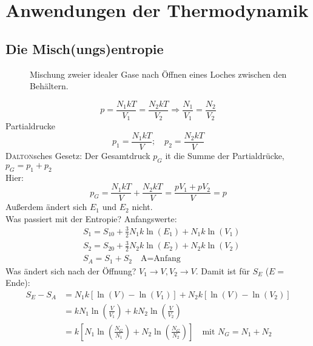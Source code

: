 \section{Anwendungen der Thermodynamik}
\subsection{Die Misch(ungs)entropie}

\begin{figure}[H]
        \centering
        \def\svgwidth{0.7\textwidth}
        
        \caption{Mischung zweier idealer Gase nach Öffnen eines Loches zwischen den Behältern.}
        \label{img:MixingOfTwoGases}
\end{figure}

\begin{equation}
    p = \frac{N_1 k T}{V_1} = \frac{N_2 k T}{V_2} \Rightarrow \frac{N_1}{V_1} = \frac{N_2}{V_2}
\end{equation}
Partialdrucke
\begin{equation}
    p_1 = \frac{N_1 k T}{V}; \quad p_2 = \frac{N_2 k T}{V}
\end{equation}
\textsc{Dalton}sches Gesetz: Der Gesamtdruck $p_G$ it die Summe der Partialdrücke, $p_G = p_1 + p_2$ \\
Hier:
\begin{equation}
    p_G = \frac{N_1 k T}{V} + \frac{N_2 k T}{V} = \frac{p V_1 + p V_2}{V} = p
\end{equation}
Außerdem ändert sich $E_1$ und $E_2$ nicht. \\
Was passiert mit der Entropie? Anfangswerte:
\begin{equation}
    \begin{split}
        & S_1 = S_{10} + \frac{3}{2} N_1 k \ln(E_1) + N_1 k \ln(V_1) \\
        & S_2 = S_{20} + \frac{3}{2} N_2 k \ln(E_2) + N_2 k \ln(V_2) \\
        & S_A = S_1 + S_2 \quad \text{A=Anfang}
    \end{split}
\end{equation}
Was ändert sich nach der Öffnung? $V_1 \to V, V_2 \to V$. Damit ist für $S_E$ ($E=$ Ende):
\begin{equation}
    \begin{split}
        S_E - S_A &= N_1 k \left[ \ln(V) - \ln(V_1) \right] + N_2 k \left[ \ln(V) - \ln(V_2) \right] \\
        &= k N_1 \ln \left( \frac{V}{V_1} \right)  + k N_2 \ln \left( \frac{V}{V_2} \right) \\
        &= k \left[ N_1 \ln \left( \frac{N_G}{N_1} \right) + N_2 \ln \left( \frac{N_G}{N_2} \right)  \right] \quad \text{mit } N_G = N_1 + N_2
    \end{split}
\end{equation}
